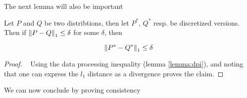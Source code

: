 The next lemma will also be important 

\begin{lemma}
    Let $P$ and $Q$ be two distribtions, then let $P^*$, $Q^*$ resp. be discretized versions. Then if 
    $\left\lVert P - Q\right\rVert_1 \leq \delta$ for some $\delta$, then

    $$
        \left\lVert P^* - Q^*\right\rVert_1 \leq \delta
    $$
    \label{lemma:quantisation}
\end{lemma}

\begin{proof}
    ~
    Using the data processing inequality (lemma \ref{lemma:dpi}), and noting that one can express the $l_1$
    distance as a divergence proves the claim. 
\end{proof}

We can now conclude by proving consistency


